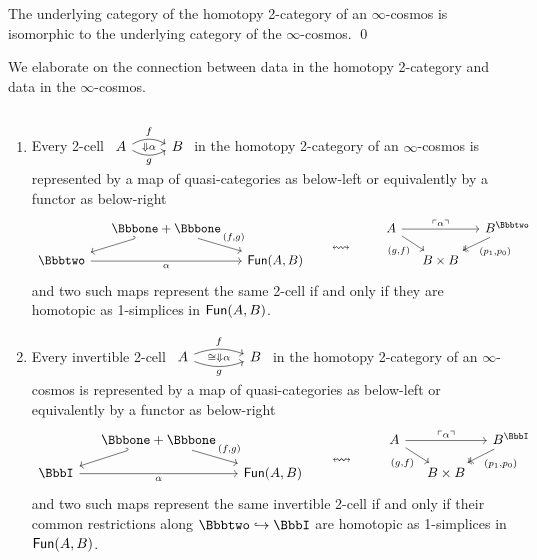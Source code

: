 \begin{lem} The underlying category of the homotopy 2-category of an $\infty$-cosmos is isomorphic to the underlying category of the $\infty$-cosmos. \qed
\end{lem}

We elaborate on the connection between data in the homotopy 2-category and data in the $\infty$-cosmos.

\begin{lem}\label{lem:invertible-2-cell}$\quad$
  \begin{enumerate}
  \item\label{itm:2-cell-as-functor} Every 2-cell $\begin{tikzcd} A \arrow[r, start anchor=15, end anchor=165, bend left, "f"] \arrow[r, start anchor=345, end anchor=195, bend right, "g"'] \arrow[r, phantom, "\scriptstyle\Downarrow\alpha"] & B \end{tikzcd}$  in the homotopy 2-category of an $\infty$-cosmos is represented by a map of quasi-categories as below-left or equivalently by a functor as below-right
  \[
   \begin{tikzcd}[sep=small] & \catone+\catone \arrow[dl, hook'] \arrow[dr, "{(f,g)}"] & &  & ~ &  A \arrow[rr, "\name{\alpha}"] \arrow[dr, "{(g,f)}"'] & & B^\cattwo \arrow[dl, "{(p_1,p_0)}", two heads] \\ \cattwo \arrow[rr, "{\alpha}"'] && \Fun(A,B) &\arrow[ur, phantom, "\leftrightsquigarrow"] &  && B \times B
  \end{tikzcd}
  \]
  and two such maps represent the same 2-cell if and only if they are homotopic as 1-simplices in ${\mathord{\mathsf{Fun}}}(A,B)$.
  \item\label{itm:2-iso-as-functor} Every invertible 2-cell $ \begin{tikzcd}[column sep=large] A \arrow[r, start anchor=18, end anchor=162, bend left=20, "f"] \arrow[r,  start anchor=342, end anchor=198, bend right=20, "g"'] \arrow[r, phantom, "\scriptstyle\cong\Downarrow\alpha"] & B \end{tikzcd}$
   in the homotopy 2-category of an $\infty$-cosmos is represented by a map of quasi-categories  as below-left or equivalently by a functor as below-right
  \[
   \begin{tikzcd}[sep=small] & \catone+\catone \arrow[dl, hook'] \arrow[dr, "{(f,g)}"] & &  & ~ &  A \arrow[rr, "\name{\alpha}"] \arrow[dr, "{(g,f)}"'] & & B^\iso \arrow[dl, "{(p_1,p_0)}", two heads] \\ \iso \arrow[rr, "{\alpha}"'] && \Fun(A,B) &\arrow[ur, phantom, "\leftrightsquigarrow"] &  && B \times B
  \end{tikzcd}
  \] and two such maps represent the same invertible 2-cell if and only if their common restrictions along $\cattwo \inc \iso$ are homotopic as 1-simplices in ${\mathord{\mathsf{Fun}}}(A,B)$.
  \end{enumerate}
  \end{lem}

